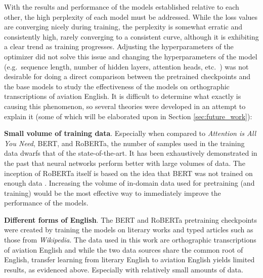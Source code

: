 \documentclass[12pt]{article}
\begin{document}
With the results and performance of the models established relative to each other, the high perplexity of each model must be addressed. While the loss
values are converging nicely during training, the perplexity is somewhat erratic and consistently high, rarely converging to a consistent curve,
although it is exhibiting a clear trend as training progresses. Adjusting the hyperparameters of the optimizer did not solve this issue and changing
the hyperparameters of the model (e.g.~sequence length, number of hidden layers, attention heads, etc.~) was not desirable for doing a direct
comparison between the pretrained checkpoints and the base models to study the effectiveness of the models on orthographic transcriptions of aviation
English. It is difficult to determine what exactly is causing this phenomenon, so several theories were developed in an attempt to explain it (some
of which will be elaborated upon in Section \ref{sec:future_work}):

\textbf{Small volume of training data}. Especially when compared to \textit{Attention is All You Need}, BERT, and RoBERTa,
\cite{vaswani_attention_2017,devlin_bert_2019,liu_roberta_2019} the number of samples used in the training data dwarfs that of the state-of-the-art.
It has been exhaustively demonstrated in the past that neural networks perform better with large volumes of data. The inception of RoBERTa itself is
based on the idea that BERT was not trained on enough data \cite{liu_roberta_2019}. Increasing the volume of in-domain data used for pretraining
(and training) would be the most effective way to immediately improve the performance of the models.

\textbf{Different forms of English}. The BERT and RoBERTa pretraining checkpoints were created by training the models on literary works and typed
articles such as those from \textit{Wikipedia}. The data used in this work are orthographic transcriptions of aviation English and while the two data
sources share the common root of English, transfer learning from literary English to aviation English yields limited results, as evidenced above.
Especially with relatively small amounts of data.
\end{document}
